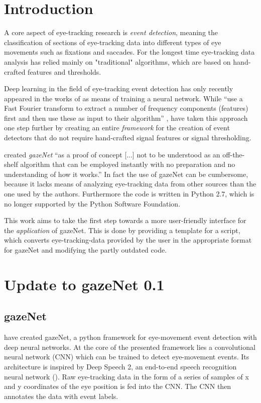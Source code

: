 \documentclass[conference]{IEEEtran}
\begin{document}
\section{Introduction}
A core aspect of eye-tracking research is \emph{event detection}, meaning the classification of sections of eye-tracking data into different types of eye movements such as fixations and saccades. For the longest time eye-tracking data analysis has relied mainly on "traditional" algorithms, which are based on hand-crafted features and thresholds. \citet{zemblys2018gazeNet} 

Deep learning in the field of eye-tracking event detection has only recently appeared in the works of  as means of training a neural network. While  ``use a Fast Fourier transform to extract a number of frequency components (features) first and then use these as input to their algorithm'' \cite{Hoppe2016EndtoEndEM}, \citet{zemblys2018gazeNet} have taken this approach one step further by creating an entire \emph{framework} for the creation of event detectors that do not require hand-crafted signal features or signal thresholding.

\citet{zemblys2018gazeNet} created \emph{gazeNet} ``as a proof of concept [...] not to be understood as an off-the-shelf algorithm that can be employed instantly with no preparation and no understanding of how it works.'' \citet*{zemblys2018gazeNet} In fact the use of gazeNet can be cumbersome, because it lacks means of analyzing eye-tracking data from other sources than the one used by the authors. Furthermore the code is written in Python 2.7, which is no longer supported by the Python Software Foundation.

This work aims to take the first step towards a more user-friendly interface for the \emph{application} of gazeNet. This is done by providing a template for a script, which converts eye-tracking-data provided by the user in the appropriate format for gazeNet and modifying the partly outdated code.


\section{Update to gazeNet 0.1}
\subsection{gazeNet}
\cite{zemblys2018gazeNet} have created gazeNet, a python framework for eye-movement event detection with deep neural networks. At the core of the presented framework lies a convolutional neural network (CNN) which can be trained to detect eye-movement events. Its architecture is inspired by Deep Speech 2, an end-to-end speech recognition neural network (\cite{deep_speech_2,zemblys2018gazeNet}). Raw eye-tracking data in the form of a series of samples of x and y coordinates of the eye position is fed into the CNN. The CNN then annotates the data with event labels.
\end{document}
